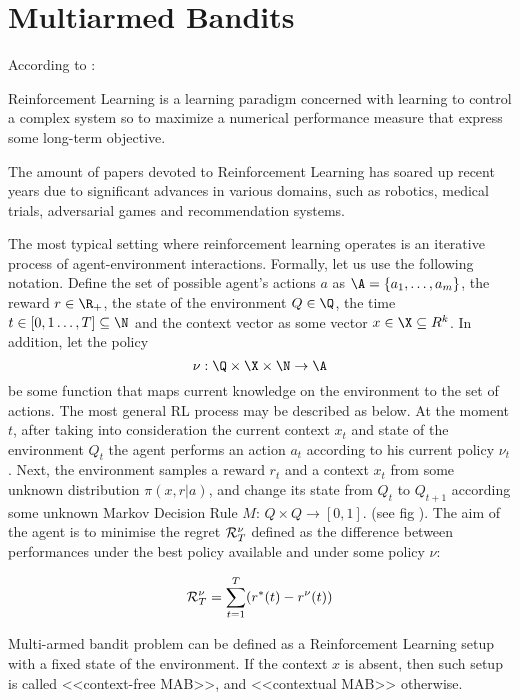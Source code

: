 
\section{Multiarmed Bandits}
According to \cite{Szepesvari2010}: 

\begin{definition}Reinforcement Learning is a learning paradigm concerned with learning to control a complex system so to maximize a numerical performance measure that express some long-term objective.    
\end{definition}

 The amount of papers devoted to Reinforcement Learning has soared up recent years due to significant advances in various domains, such as robotics, medical trials, adversarial games and recommendation systems.

 The most typical setting where reinforcement learning operates is an iterative process of agent-environment interactions. Formally, let us use the following notation. Define the set of possible agent's actions $a$ as $\A = \{a_1, \dots, a_m \}$, the reward $r \in \R_{+}$, the state of the environment $Q \in \Q$, the time $t \in [0, 1 \dots, T] \subseteq \N$ and the context vector as some vector $x \in \X \subseteq R^k$. In addition, let the policy $$\nu:\Q \times \X \times \N \to \A$$ be some function that maps current knowledge on the environment to the set of actions. The most general RL process may be described as below. At the moment $t$, after taking into consideration the current context $x_t$ and state of the environment $Q_t$ the agent performs an action $a_t$ according to his current policy $\nu_t$. Next, the environment samples a reward $r_t$ and a context $x_t$ from some unknown distribution $\pi(x,r|a)$, and change its state from $Q_t$ to $Q_{t+1}$ according some unknown Markov Decision Rule $M:\, Q \times Q \to [0, 1]$. (see fig ). The aim of the agent is to minimise the regret ${\cal R}^\nu_T$ defined as the difference between performances under the best policy available and under some policy $\nu$:
 
$$
        {\cal R}^\nu_T = \sum_{t=1}^T(r^*(t) - r^{\nu}(t))
$$
 
  Multi-armed bandit problem can be defined as a Reinforcement Learning setup with a fixed state of the environment. If the context $x$ is absent, then such setup is called <<context-free MAB>>, and <<contextual MAB>> otherwise. 
  
